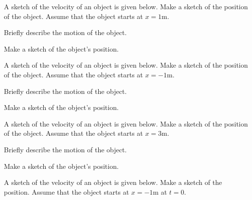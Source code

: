 \begin{problem}
  \item A sketch of the velocity of an object is given below.
    Make a sketch of the position of the object. Assume that
    the object starts at $x=1$m.

    \scalebox{0.8}{}

    \begin{subproblem}
    \item Briefly describe the motion of the object.
      \vfill
    \item Make a sketch of the object's position.
    \end{subproblem}

    \clearpage

    \item A sketch of the velocity of an object is given below.
      Make a sketch of the position of the object. Assume that
      the object starts at $x=-1$m.

      \scalebox{0.8}{}

      \begin{subproblem}
      \item Briefly describe the motion of the object.
        \vfill
      \item Make a sketch of the object's position.
      \end{subproblem}

    \clearpage

    \item A sketch of the velocity of an object is given below.
      Make a sketch of the position of the object. Assume that
      the object starts at $x=3$m.

      \scalebox{0.8}{}

      \begin{subproblem}
      \item Briefly describe the motion of the object.
        \vfill
      \item Make a sketch of the object's position.
      \end{subproblem}

    \clearpage

  \item A sketch of the velocity of an object is given below. Make a
    sketch of the position. Assume that the object starts at $x=-1$m
    at $t=0$.


\end{problem}
